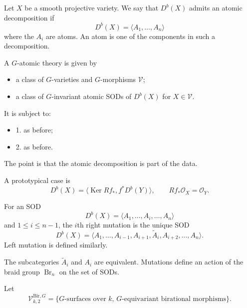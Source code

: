 \begin{definition}
Let $X$ be a smooth projective variety.
We say that $D^b(X)$ admits an atomic
decomposition if
$$
D^b(X)=\langle A_1,\dots,A_n\rangle
$$
where the $A_i$ are atoms.
An atom is one of the components in
such a decomposition.
\end{definition}

\begin{definition}
\label{definition-g-atomic}
A $G$-atomic theory is given by
\begin{itemize}
\item a class of $G$-varieties and
$G$-morphisms $\mathcal V$;
\item a class of $G$-invariant atomic
SODs of $D^b(X)$ for $X\in\mathcal V$.
\end{itemize}
It is subject to:
\begin{itemize}
\item[] 1. as before;
\item[] 2. as before.
\end{itemize}
The point is that the atomic
decomposition is part of the data.
\end{definition}

\begin{remark}
\label{remark-prototypical-case}
A prototypical case is
\[
D^b(X)=\langle
\operatorname{Ker}Rf_*,
f^*D^b(Y)
\rangle,
\qquad
Rf_*\mathcal O_X=\mathcal O_Y.
\]
\end{remark}

\begin{definition}
\label{definition-sod-d}
For an SOD
\[
D^b(X)=\langle A_1,\dots,A_i,
\dots,A_n\rangle
\]
and $1\leq i\leq n-1$, the $i$th
right mutation is the unique SOD
\[
D^b(X)=\langle A_1,\dots,A_{i-1},
A_{i+1},\widetilde A_i,
A_{i+2},\dots,A_n\rangle.
\]
Left mutation is defined similarly.
\end{definition}

\begin{remark}
\label{remark-subcategories-i}
The subcategories $\widetilde A_i$
and $A_i$ are equivalent.
Mutations define an action of the
braid group $\operatorname{Br}_n$ on
the set of SODs.
\end{remark}

\begin{definition}
\label{definition-let-v}
Let
\[
\mathcal V_{k,2}^{\mathrm{Bir},G}
=\{
G\text{-surfaces over }k,\,
G\text{-equivariant birational
morphisms}
\}.
\]
\end{definition}

